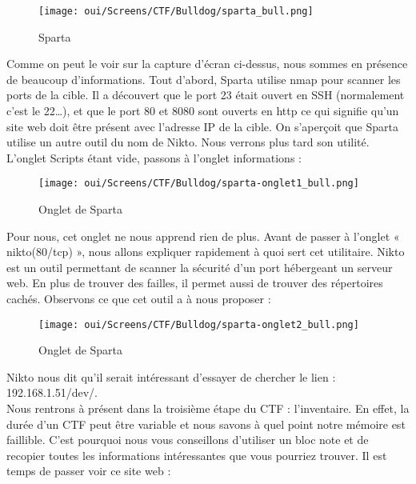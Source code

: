 \begin{figure}[htp!]
  \centering
  \setlength\figureheight{7cm}
  \setlength\figurewidth{9cm}
  \texttt{[image: oui/Screens/CTF/Bulldog/sparta\_bull.png]}
  \caption{Sparta}
  \label{fig:courbe-tikz}
\end{figure}

\newpage
 Comme on peut le voir sur la capture d’écran ci-dessus, nous sommes en présence de beaucoup d’informations. Tout d’abord, Sparta utilise nmap pour scanner les ports de la cible. Il a découvert que le port 23 était ouvert en SSH (normalement c’est le 22…), et que le port 80 et 8080 sont ouverts en http ce qui signifie qu’un site web doit être présent avec l’adresse IP de la cible. On s’aperçoit que Sparta utilise un autre outil du nom de Nikto. Nous verrons plus tard son utilité. \\
L’onglet Scripts étant vide, passons à l’onglet informations :

\begin{figure}[htp!]
  \centering
  \setlength\figureheight{7cm}
  \setlength\figurewidth{9cm}
  \texttt{[image: oui/Screens/CTF/Bulldog/sparta-onglet1\_bull.png]}
  \caption{Onglet de Sparta}
  \label{fig:courbe-tikz}
\end{figure}

Pour nous, cet onglet ne nous apprend rien de plus. Avant de passer à l’onglet « nikto(80/tcp) », nous allons expliquer rapidement à quoi sert cet utilitaire. Nikto est un outil permettant de scanner la sécurité d’un port hébergeant un serveur web. En plus de trouver des failles, il permet aussi de trouver des répertoires cachés. Observons ce que cet outil a à nous proposer :

\begin{figure}[htp!]
  \centering
  \setlength\figureheight{7cm}
  \setlength\figurewidth{9cm}
  \texttt{[image: oui/Screens/CTF/Bulldog/sparta-onglet2\_bull.png]}
  \caption{Onglet de Sparta}
  \label{fig:courbe-tikz}
\end{figure}

Nikto nous dit qu’il serait intéressant d’essayer de chercher le lien : 192.168.1.51/dev/. \\
Nous rentrons à présent dans la troisième étape du CTF : l’inventaire. En effet, la durée d’un CTF peut être variable et nous savons à quel point notre mémoire est faillible. C’est pourquoi nous vous conseillons d’utiliser un bloc note et de recopier toutes les informations intéressantes que vous pourriez trouver.
Il est temps de passer voir ce site web : 

